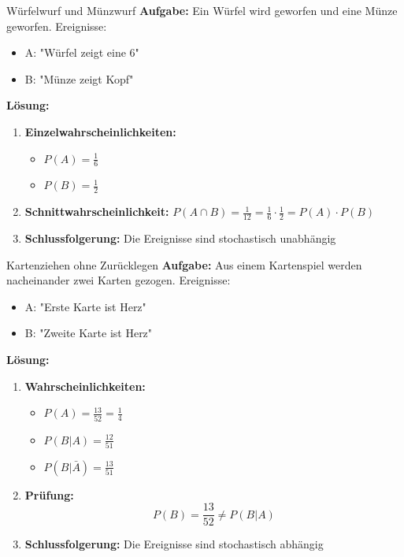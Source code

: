 \begin{example}{Würfelwurf und Münzwurf}
\textbf{Aufgabe:} Ein Würfel wird geworfen und eine Münze geworfen.
Ereignisse:
\begin{itemize}
\item A: "Würfel zeigt eine 6"
\item B: "Münze zeigt Kopf"
\end{itemize}

\textbf{Lösung:}
\begin{enumerate}
\item \textbf{Einzelwahrscheinlichkeiten:}
   \begin{itemize}
   \item $P(A) = \frac{1}{6}$
   \item $P(B) = \frac{1}{2}$
   \end{itemize}

\item \textbf{Schnittwahrscheinlichkeit:}
   $P(A \cap B) = \frac{1}{12} = \frac{1}{6} \cdot \frac{1}{2} = P(A) \cdot P(B)$

\item \textbf{Schlussfolgerung:} Die Ereignisse sind stochastisch unabhängig
\end{enumerate}
\end{example}

\begin{example}{Kartenziehen ohne Zurücklegen}
\textbf{Aufgabe:} Aus einem Kartenspiel werden nacheinander zwei Karten gezogen.
Ereignisse:
\begin{itemize}
\item A: "Erste Karte ist Herz"
\item B: "Zweite Karte ist Herz"
\end{itemize}

\textbf{Lösung:}
\begin{enumerate}
\item \textbf{Wahrscheinlichkeiten:}
   \begin{itemize}
   \item $P(A) = \frac{13}{52} = \frac{1}{4}$
   \item $P(B|A) = \frac{12}{51}$
   \item $P(B|\bar{A}) = \frac{13}{51}$
   \end{itemize}

\item \textbf{Prüfung:}
   $$P(B) = \frac{13}{52} \neq P(B|A)$$

\item \textbf{Schlussfolgerung:} Die Ereignisse sind stochastisch abhängig
\end{enumerate}
\end{example}



